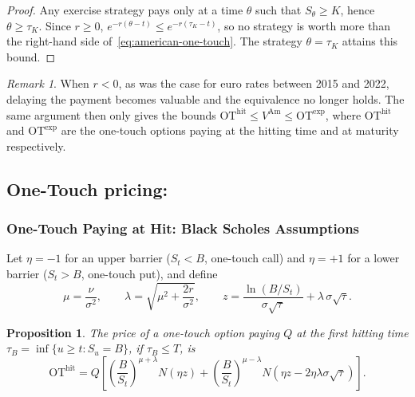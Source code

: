 \documentclass[11pt,a4paper]{article}
\newtheorem{proposition}{Proposition}[section]
\theoremstyle{remark}
\newtheorem{remark}{Remark}[section]
\begin{document}
\begin{proof}
Any exercise strategy pays only at a time $\theta$ such that
$S_\theta \geq K$, hence $\theta \geq \tau_K$. Since $r \geq 0$,
$e^{-r(\theta-t)} \leq e^{-r(\tau_K-t)}$, so no strategy is worth more than
the right-hand side of~\eqref{eq:american-one-touch}. The strategy
$\theta = \tau_K$ attains this bound.
\end{proof}

\begin{remark}
When $r < 0$, as was the case for euro rates between 2015 and 2022, delaying
the payment becomes valuable and the equivalence no longer holds. The same
argument then only gives the bounds
$\mathrm{OT}^{\mathrm{hit}} \leq V^{\mathrm{Am}} \leq \mathrm{OT}^{\mathrm{exp}}$,
where $\mathrm{OT}^{\mathrm{hit}}$ and $\mathrm{OT}^{\mathrm{exp}}$ are the
one-touch options paying at the hitting time and at maturity respectively.
\end{remark}


\subsection{One-Touch pricing:}
\subsubsection{One-Touch Paying at Hit: Black Scholes Assumptions}
\label{subsec:one-touch-hit}

Let $\eta = -1$ for an upper barrier ($S_t < B$, one-touch call) and
$\eta = +1$ for a lower barrier ($S_t > B$, one-touch put), and define
\begin{equation}
  \mu = \frac{\nu}{\sigma^2},
  \qquad
  \lambda = \sqrt{\mu^2 + \frac{2r}{\sigma^2}},
  \qquad
  z = \frac{\ln(B/S_t)}{\sigma\sqrt{\tau}} + \lambda\,\sigma\sqrt{\tau}.
  \label{eq:ot-parameters}
\end{equation}

\begin{proposition}
\label{prop:one-touch-hit}
The price of a one-touch option paying $Q$ at the first hitting time
$\tau_B = \inf\{u \geq t : S_u = B\}$, if $\tau_B \leq T$,
is~\cite{ReinerRubinstein1991,Haug2007}
\begin{equation}
  \mathrm{OT}^{\mathrm{hit}}
  = Q\left[\left(\frac{B}{S_t}\right)^{\mu+\lambda} N(\eta z)
  + \left(\frac{B}{S_t}\right)^{\mu-\lambda} N\!\left(\eta z - 2\eta\lambda\sigma\sqrt{\tau}\right)\right].
  \label{eq:one-touch-hit}
\end{equation}
\end{proposition}
\end{document}
